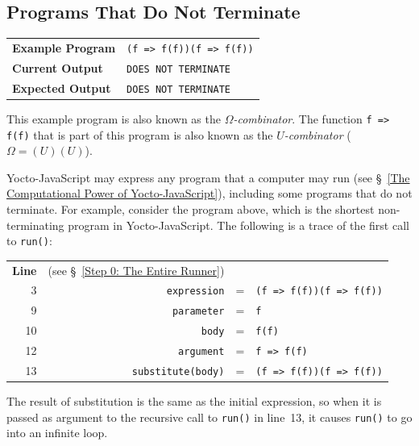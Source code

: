 \documentclass[12pt, oneside]{book}
\begin{document}
\subsection{Programs That Do Not Terminate}
\label{Step 0: Programs That Do Not Terminate}

\begin{center}
\begin{tabular}{ll}
\textbf{Example Program} & \texttt{(f => f(f))(f => f(f))} \\
\textbf{Current Output} & \texttt{DOES NOT TERMINATE} \\
\textbf{Expected Output} & \texttt{DOES NOT TERMINATE} \\
\end{tabular}
\end{center}

\begin{mdframed}[frametitle = {Technical Terms}]
This example program is also known as the \emph{$\Omega$-combinator}. The function \texttt{f => f(f)} that is part of this program is also known as the \emph{$U$-combinator} ($\Omega = (U)(U)$).
\end{mdframed}

Yocto-JavaScript may express any program that a computer may run (see §~\ref{The Computational Power of Yocto-JavaScript}), including some programs that do not terminate. For example, consider the program above, which is the shortest non-terminating program in Yocto-JavaScript. The following is a trace of the first call to \texttt{run()}:

\begin{center}
\begin{tabular}{rrcl}
\textbf{Line} & \multicolumn{1}{l}{(see §~\ref{Step 0: The Entire Runner})} & & \\
3 & \texttt{expression} & = & \texttt{(f => f(f))(f => f(f))} \\
9 & \texttt{parameter} & = & \texttt{f} \\
10 & \texttt{body} & = & \texttt{f(f)} \\
12 & \texttt{argument} & = & \texttt{f => f(f)} \\
13 & \texttt{substitute(body)} & = & \texttt{(f => f(f))(f => f(f))} \\
\end{tabular}
\end{center}

The result of substitution is the same as the initial expression, so when it is passed as argument to the recursive call to \texttt{run()} in line~13, it causes \texttt{run()} to go into an infinite loop.
\end{document}
